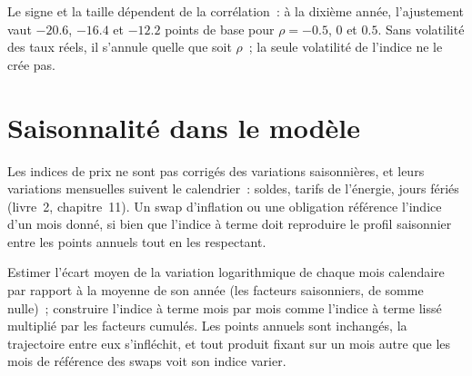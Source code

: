 \begin{omfigure}

\label{fig:rc:inflation-derivatives:convexity}
\end{omfigure}

Le signe et la taille dépendent de la corrélation~: à la dixième année, l'ajustement vaut
$-20.6$, $-16.4$ et $-12.2$ points de base pour $\rho = -0.5$, $0$ et $0.5$. Sans volatilité
des taux réels, il s'annule quelle que soit $\rho$~; la seule volatilité de l'indice ne le crée pas.

\section{Saisonnalité dans le modèle}

Les indices de prix ne sont pas corrigés des variations saisonnières, et leurs variations mensuelles suivent le
calendrier~: soldes, tarifs de l'énergie, jours fériés (livre~2, chapitre~11). Un
swap d'inflation ou une obligation référence l'indice d'un mois donné, si bien que l'indice à terme doit
reproduire le profil saisonnier entre les points annuels tout en les respectant.

\begin{method}\label{met:rc:inflation-derivatives:season}
Estimer l'écart moyen de la variation logarithmique de chaque mois calendaire par rapport
à la moyenne de son année (les facteurs saisonniers, de somme nulle)~; construire l'indice à terme mois par mois
comme l'indice à terme lissé multiplié par les facteurs cumulés. Les points annuels sont inchangés, la
trajectoire entre eux s'infléchit, et tout produit fixant sur un mois autre que les mois de référence des
swaps voit son indice varier.
\end{method}

